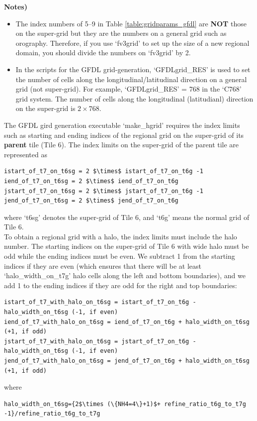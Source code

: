 \documentclass[11pt,fleqn]{report}              %
\begin{document}
\begin{enumerate}
{\bf Notes)}
\begin{itemize}
\item The index numbers of 5--9 in Table \ref{table:gridparams_gfdl} are {\bf NOT} those on the super-grid but they are the numbers on a general grid such as orography. Therefore, if you use `fv3grid' to set up the size of a new regional domain, you should divide the numbers on `fv3grid' by 2. 
\item In the scripts for the GFDL grid-generation, `GFDLgrid\_RES' is used to set the number of cells along the longitudinal/latitudinal direction on a general grid (not super-grid). For example, `GFDLgrid\_RES' = 768 in the `C768' grid system. The number of cells along the longitudinal (latitudianl) direction on the super-grid is $2\times768$.  
\end{itemize}
 

The GFDL gird generation executable `make\_hgrid' requires the index limits such as starting and ending indices of the regional grid on the super-grid of its {\bf parent} tile (Tile 6). The index limits on the super-grid of the parent tile are represented as
\lstset{language=bash}   
\begin{lstlisting}[frame=trBL,mathescape=true]
istart_of_t7_on_t6sg = 2 $\times$ istart_of_t7_on_t6g -1 
iend_of_t7_on_t6sg = 2 $\times$ iend_of_t7_on_t6g  
jstart_of_t7_on_t6sg = 2 $\times$ jstart_of_t7_on_t6g -1 
jend_of_t7_on_t6sg = 2 $\times$ jend_of_t7_on_t6g  
\end{lstlisting}
where `t6sg' denotes the super-grid of Tile 6, and `t6g' means the normal grid of Tile 6. \\

To obtain a regional grid with a halo, the index limits must include the halo number. The starting indices on the super-grid of Tile 6 with wide halo must be odd while the ending indices must be even. We subtract 1 from the starting indices if they are even (which ensures that there will be at least `halo\_width\_on\_t7g' halo cells along the left and bottom boundaries), and we add 1 to the ending indices if they are odd for the right and top boundaries:

\lstset{language=bash}   
\begin{lstlisting}[frame=trBL,mathescape=true, basicstyle=\small]
istart_of_t7_with_halo_on_t6sg = istart_of_t7_on_t6g - halo_width_on_t6sg (-1, if even) 
iend_of_t7_with_halo_on_t6sg = iend_of_t7_on_t6g + halo_width_on_t6sg (+1, if odd) 
jstart_of_t7_with_halo_on_t6sg = jstart_of_t7_on_t6g - halo_width_on_t6sg (-1, if even)
jend_of_t7_with_halo_on_t6sg = jend_of_t7_on_t6g + halo_width_on_t6sg  (+1, if odd)
\end{lstlisting}
where
\lstset{language=bash}   
\begin{lstlisting}[frame=trBL,mathescape=true, basicstyle=\small]
halo_width_on_t6sg={2$\times (\{NH4=4\}+1)$+ refine_ratio_t6g_to_t7g -1}/refine_ratio_t6g_to_t7g
\end{lstlisting}
\vspace{0.5cm}


\end{enumerate}
\end{document}
